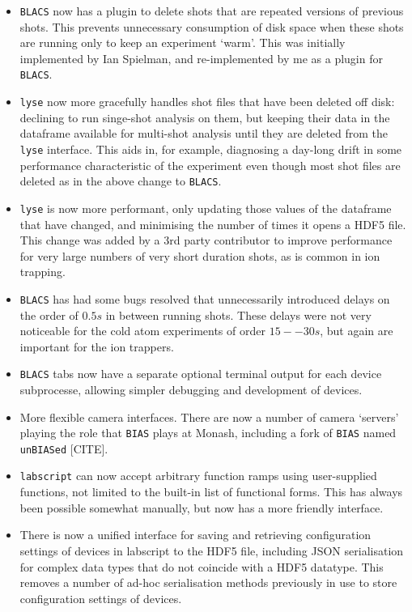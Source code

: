 \begin{itemize}
    \item \texttt{BLACS} now has a plugin to delete shots that are repeated versions of previous shots. This prevents unnecessary consumption of disk space when these shots are running only to keep an experiment `warm'. This was initially implemented by Ian Spielman, and re-implemented by me as a plugin for \texttt{BLACS}.
    \item \texttt{lyse} now more gracefully handles shot files that have been deleted off disk: declining to run singe-shot analysis on them, but keeping their data in the dataframe available for multi-shot analysis until they are deleted from the \texttt{lyse} interface. This aids in, for example, diagnosing a day-long drift in some performance characteristic of the experiment even though most shot files are deleted as in the above change to \texttt{BLACS}.
    \item \texttt{lyse} is now more performant, only updating those values of the dataframe that have changed, and minimising the number of times it opens a HDF5 file. This change was added by a 3rd party contributor to improve performance for very large numbers of very short duration shots, as is common in ion trapping.
    \item \texttt{BLACS} has had some bugs resolved that unnecessarily introduced delays on the order of $0.5\unit{s}$ in between running shots. These delays were not very noticeable for the cold atom experiments of order $15--30\unit{s}$, but again are important for the ion trappers.
    \item \texttt{BLACS} tabs now have a separate optional terminal output for each device subprocesse, allowing simpler debugging and development of devices.
    \item More flexible camera interfaces. There are now a number of camera `servers' playing the role that \texttt{BIAS} plays at Monash, including a fork of \texttt{BIAS} named \texttt{unBIASed} [CITE].
    \item \texttt{labscript} can now accept arbitrary function ramps using user-supplied functions, not limited to the built-in list of functional forms. This has always been possible somewhat manually, but now has a more friendly interface.
    \item There is now a unified interface for saving and retrieving configuration settings of devices in labscript to the HDF5 file, including JSON serialisation for complex data types that do not coincide with a HDF5 datatype. This removes a number of ad-hoc serialisation methods previously in use to store configuration settings of devices.

\end{itemize}
